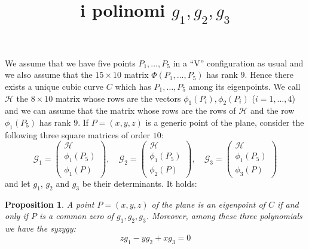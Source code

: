 \documentclass[10pt, a4paper, reqno, captions=tableheading,bibliography=totoc]{scrartcl}
\title{i polinomi $g_1, g_2,g_3$}
\author{}
\date{}
\theoremstyle{plain}
\newtheorem{prop}[lemma]{Proposition}
\theoremstyle{definition}
\begin{document}
\maketitle

We assume that we have five points $P_1, \dots, P_5$ in a ``V'' configuration
as usual and we also assume that the $15\times 10$ matrix
$\Phi(P_1, \dots, P_5)$ has rank $9$. Hence there exists a unique cubic
curve $C$ which has $P_1, \dots, P_5$ among its eigenpoints. 
We call $\mathcal{H}$ the $8\times 10$ matrix whose rows are the vectors
$\phi_1(P_i), \phi_2(P_i)$ ($i = 1, \dots, 4$) and we can assume
that the matrix whose rows are the rows of $\mathcal{H}$ and the
row $\phi_1(P_5)$
has rank $9$. If $P=(x, y, z)$ is a generic point of the plane,
consider the following three square matrices of order $10$:
\[ \mathcal{G}_1 = 
\left(
\begin{array}{c}
  \mathcal{H} \\
  \phi_1(P_5)\\
  \phi_1(P)
\end{array}
\right),
\quad
\mathcal{G}_2 = 
\left(
\begin{array}{c}
  \mathcal{H} \\
  \phi_1(P_5)\\
  \phi_2(P)
\end{array}
\right),
\quad
\mathcal{G}_3 = 
\left(
\begin{array}{c}
  \mathcal{H} \\
  \phi_1(P_5)\\
  \phi_3(P)
\end{array}
\right)
\]
and let $g_1$, $g_2$ and $g_3$ be their determinants.
It holds:
\begin{prop}
  A point $P=(x, y, z)$ of the plane is an eigenpoint of $C$ if and only if
  $P$ is a common zero of $g_1, g_2, g_3$. Moreover, among these three
  polynomials we have the syzygy:
  \[
   z g_1-y g_2 +x g_3 = 0
   \]
   \label{threeG}
\end{prop}
\end{document}
